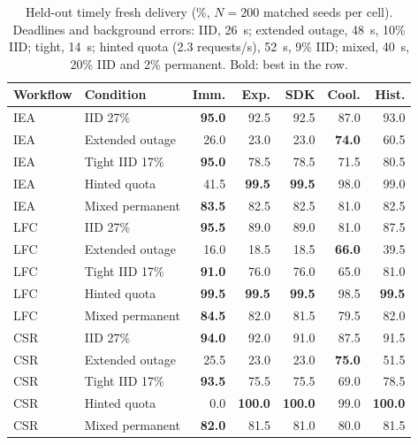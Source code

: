 \begin{table}[t]
\centering
\caption{Held-out timely fresh delivery (\%, $N=200$ matched seeds per cell). Deadlines and background errors: IID, 26~s; extended outage, 48~s, 10\% IID; tight, 14~s; hinted quota (2.3 requests/s), 52~s, 9\% IID; mixed, 40~s, 20\% IID and 2\% permanent. Bold: best in the row.}
\label{tab:main}
\begin{tabular}{@{}llrrrrr@{}}\toprule
Workflow & Condition & Imm. & Exp. & SDK & Cool. & Hist.\\\midrule
IEA & IID 27\% & \textbf{95.0} & 92.5 & 92.5 & 87.0 & 93.0\\
IEA & Extended outage & 26.0 & 23.0 & 23.0 & \textbf{74.0} & 60.5\\
IEA & Tight IID 17\% & \textbf{95.0} & 78.5 & 78.5 & 71.5 & 80.5\\
IEA & Hinted quota & 41.5 & \textbf{99.5} & \textbf{99.5} & 98.0 & 99.0\\
IEA & Mixed permanent & \textbf{83.5} & 82.5 & 82.5 & 81.0 & 82.5\\
LFC & IID 27\% & \textbf{95.5} & 89.0 & 89.0 & 81.0 & 87.5\\
LFC & Extended outage & 16.0 & 18.5 & 18.5 & \textbf{66.0} & 39.5\\
LFC & Tight IID 17\% & \textbf{91.0} & 76.0 & 76.0 & 65.0 & 81.0\\
LFC & Hinted quota & \textbf{99.5} & \textbf{99.5} & \textbf{99.5} & 98.5 & \textbf{99.5}\\
LFC & Mixed permanent & \textbf{84.5} & 82.0 & 81.5 & 79.5 & 82.0\\
CSR & IID 27\% & \textbf{94.0} & 92.0 & 91.0 & 87.5 & 91.5\\
CSR & Extended outage & 25.5 & 23.0 & 23.0 & \textbf{75.0} & 51.5\\
CSR & Tight IID 17\% & \textbf{93.5} & 75.5 & 75.5 & 69.0 & 78.5\\
CSR & Hinted quota & 0.0 & \textbf{100.0} & \textbf{100.0} & 99.0 & \textbf{100.0}\\
CSR & Mixed permanent & \textbf{82.0} & 81.5 & 81.0 & 80.0 & 81.5\\\bottomrule
\end{tabular}
\end{table}
